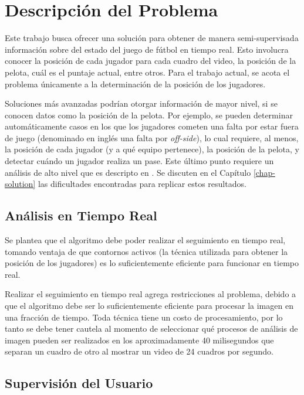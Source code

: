 \chapter{Descripción del Problema}
\label{chap-problems}

Este trabajo busca ofrecer una solución para obtener de manera semi-supervisada
información sobre del estado del juego de fútbol en tiempo real. Esto involucra
conocer la posición de cada jugador para cada cuadro del video, la posición de
la pelota, cuál es el puntaje actual, entre otros. Para el trabajo actual, se
acota el problema únicamente a la determinación de la posición de los
jugadores.

Soluciones más avanzadas podrían otorgar información de mayor nivel,
si se conocen datos como la posición de la pelota. Por ejemplo, se pueden
determinar automáticamente casos en los que los jugadores cometen una falta por
estar fuera de juego (denominado en inglés una falta por \textit{off-side}), lo
cual requiere, al menos, la posición de cada jugador (y a qué equipo
pertenece), la posición de la pelota, y detectar cuándo un jugador realiza un
pase. Este último punto requiere un análisis de alto nivel que es descripto en
\cite{papers-tanos}. Se discuten en el Capítulo \ref{chap-solution} las
dificultades encontradas para replicar estos resultados.

\section{Análisis en Tiempo Real}

Se plantea que el algoritmo debe poder realizar el seguimiento en tiempo
real, tomando ventaja de que contornos activos (la técnica utilizada para
obtener la posición de los jugadores) es lo suficientemente eficiente para
funcionar en tiempo real.

Realizar el seguimiento en tiempo real agrega restricciones al problema, debido
a que el algoritmo debe ser lo suficientemente eficiente para procesar la
imagen en una fracción de tiempo. Toda técnica tiene un costo de procesamiento,
por lo tanto se debe tener cautela al momento de seleccionar qué procesos de
análisis de imagen pueden ser realizados en los aproximadamente 40 milisegundos
que separan un cuadro de otro al mostrar un video de 24 cuadros por segundo.

\section{Supervisión del Usuario}

